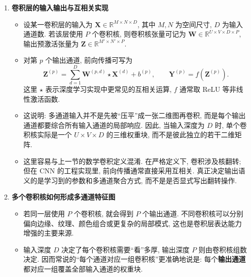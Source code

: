 \documentclass{../nndlcourse}
\begin{document}
\begin{enumerate}
    \item \textbf{卷积层的输入输出与互相关实现}
    \begin{itemize}
        \item 设某一卷积层的输入为 $\boldsymbol{X} \in \mathbb{R}^{M \times N \times D}$, 其中 $M, N$ 为空间尺寸, $D$ 为输入通道数. 若该层使用 $P$ 个卷积核, 则卷积核张量可记为 $\boldsymbol{W} \in \mathbb{R}^{U \times V \times D \times P}$, 输出预激活张量为 $\boldsymbol{Z} \in \mathbb{R}^{M' \times N' \times P}$.
        \item 对第 $p$ 个输出通道, 前向传播可写为
        \begin{equation*}
            \boldsymbol{Z}^{(p)} = \sum_{d=1}^{D} \boldsymbol{W}^{(p,d)} \star \boldsymbol{X}^{(d)} + b^{(p)},
            \qquad
            \boldsymbol{Y}^{(p)} = f\left(\boldsymbol{Z}^{(p)}\right).
        \end{equation*}
        这里 $\star$ 表示深度学习实现中更常见的互相关运算, $f$ 通常取 ReLU 等非线性激活函数.
        \item 这说明: 多通道输入并不是先被“压平”成一张二维图再卷积, 而是每个输出通道都要综合所有输入通道的局部响应. 因此, 当输入深度为 $D$ 时, 单个卷积核实际是一个 $U \times V \times D$ 的三维权重块, 而不是彼此独立的若干二维矩阵.
        \item 这里容易与上一节的数学卷积定义混淆. 在严格定义下, 卷积涉及核翻转; 但在 CNN 的工程实现里, 前向传播通常直接采用互相关. 真正决定输出语义的是学习到的参数和多通道聚合方式, 而不是是否显式写出翻转操作.
    \end{itemize}

    \item \textbf{多个卷积核如何形成多通道特征图}
    \begin{itemize}
        \item 若同一层使用 $P$ 个卷积核, 就会得到 $P$ 个输出通道. 不同卷积核可以分别偏向边缘、纹理、颜色组合或更复杂的局部模式, 这也是卷积层表达能力增强的主要来源.
        \item 输入深度 $D$ 决定了每个卷积核需要“看”多厚, 输出深度 $P$ 则由卷积核组数决定. 因而常说的“每个通道对应一组卷积核”更准确地说是: 每个\textbf{输出通道}都对应一组覆盖全部输入通道的权重块.
    \end{itemize}

    \begin{center}
\end{center}
\end{enumerate}
\end{document}
